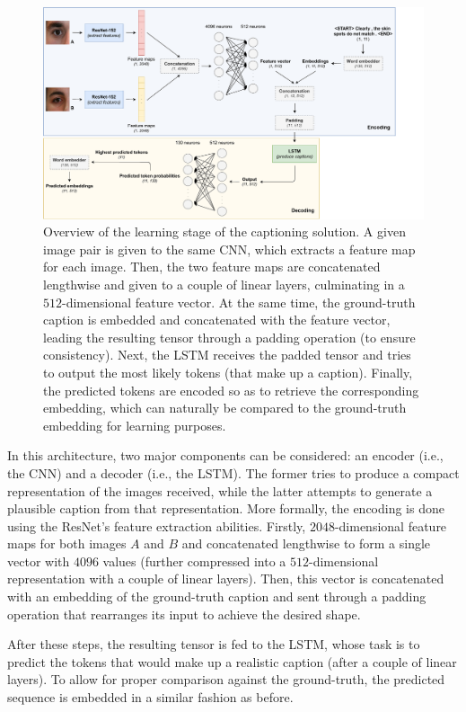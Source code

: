 \begin{figure}[H]
\centering
\includegraphics[width=430pt]{figures/figure_30.pdf}
\caption{Overview of the learning stage of the captioning solution. A given image pair is given to the same \ac{CNN}, which extracts a feature map for each image. Then, the two feature maps are concatenated lengthwise and given to a couple of linear layers, culminating in a $512$-dimensional feature vector. At the same time, the ground-truth caption is embedded and concatenated with the feature vector, leading the resulting tensor through a padding operation (to ensure consistency). Next, the \ac{LSTM} receives the padded tensor and tries to output the most likely tokens (that make up a caption). Finally, the predicted tokens are encoded so as to retrieve the corresponding embedding, which can naturally be compared to the ground-truth embedding for learning purposes.}
\label{fig:method_b_main_diagram_learning_phase}
\end{figure}

In this architecture, two major components can be considered: an encoder (i.e., the \ac{CNN}) and a decoder (i.e., the \ac{LSTM}). The former tries to produce a compact representation of the images received, while the latter attempts to generate a plausible caption from that representation. More formally, the encoding is done using the ResNet's feature extraction abilities. Firstly, $2048$-dimensional feature maps for both images $A$ and $B$ and concatenated lengthwise to form a single vector with $4096$ values (further compressed into a $512$-dimensional representation with a couple of linear layers). Then, this vector is concatenated with an embedding of the ground-truth caption and sent through a padding operation that rearranges its input to achieve the desired shape.

After these steps, the resulting tensor is fed to the \ac{LSTM}, whose task is to predict the tokens that would make up a realistic caption (after a couple of linear layers). To allow for proper comparison against the ground-truth, the predicted sequence is embedded in a similar fashion as before.

